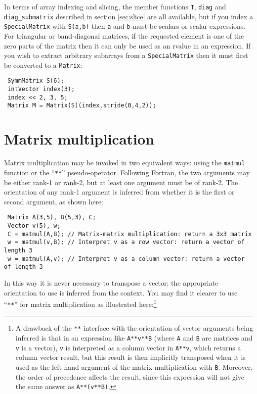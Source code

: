 \documentclass[a4,oneside]{book}
\def\codesize{\small}
\def\code#1{{\codesize\texttt{#1}}}
\begin{document}
In terms of array indexing and slicing, the member functions \code{T},
\code{diag} and \code{diag\_submatrix} described in section
\ref{sec:slice} are all available, but if you index a
\code{SpecialMatrix} with \code{S(a,b)} then \code{a} and \code{b} must
be scalars or scalar expressions. For triangular or band-diagonal
matrices, if the requested element is one of the zero parts of the
matrix then it can only be used as an rvalue in an expression. If you
wish to extract arbitrary subarrays from a \code{SpecialMatrix} then it
must first be converted to a \code{Matrix}:
\begin{lstlisting}
 SymmMatrix S(6);
 intVector index(3);
 index << 2, 3, 5;
 Matrix M = Matrix(S)(index,stride(0,4,2));
\end{lstlisting}


\section{Matrix multiplication}
\label{sec:matmul}
Matrix multiplication may be invoked in two equivalent ways: using the
\code{matmul} function or the ``\code{**}'' pseudo-operator. Following
Fortran, the two arguments may be either rank-1 or rank-2, but at
least one argument must be of rank-2. The orientation of any rank-1
argument is inferred from whether it is the first or second argument,
as shown here:
\begin{lstlisting}
 Matrix A(3,5), B(5,3), C;
 Vector v(5), w;
 C = matmul(A,B); // Matrix-matrix multiplication: return a 3x3 matrix
 w = matmul(v,B); // Interpret v as a row vector: return a vector of length 3
 w = matmul(A,v); // Interpret v as a column vector: return a vector of length 3
\end{lstlisting}
In this way it is never necessary to transpose a vector; the
appropriate orientation to use is inferred from the context.  You may
find it clearer to use ``\code{**}'' for matrix multiplication as
illustrated here:\footnote{A drawback of the \code{**} interface with
  the orientation of vector arguments being inferred is that in an
  expression like \code{A**v**B} (where \code{A} and \code{B} are
  matrices and \code{v} is a vector), \code{v} is interpreted as a
  column vector in \code{A**v}, which returns a column vector result,
  but this result is then implicitly transposed when it is used as the
  left-hand argument of the matrix multiplication with \code{B}.
  Moreover, the order of precedence affects the result, since this
  expression will not give the same answer as \code{A**(v**B)}.
}
\end{document}
